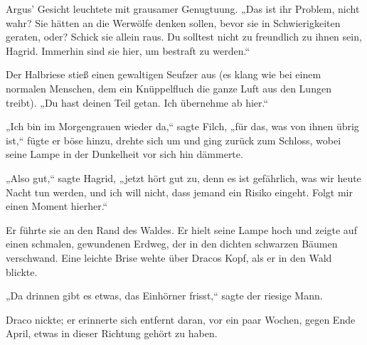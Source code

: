 Argus' Gesicht leuchtete mit grausamer Genugtuung. „Das ist ihr Problem, nicht wahr? Sie hätten an die Werwölfe denken sollen, bevor sie in Schwierigkeiten geraten, oder? Schick sie allein raus. Du solltest nicht zu freundlich zu ihnen sein, Hagrid. Immerhin sind sie hier, um bestraft zu werden.“

Der Halbriese stieß einen gewaltigen Seufzer aus (es klang wie bei einem normalen Menschen, dem ein Knüppelfluch die ganze Luft aus den Lungen treibt). „Du hast deinen Teil getan. Ich übernehme ab hier.“

„Ich bin im Morgengrauen wieder da,“ sagte Filch, „für das, was von ihnen übrig ist,“ fügte er böse hinzu, drehte sich um und ging zurück zum Schloss, wobei seine Lampe in der Dunkelheit vor sich hin dämmerte.

„Also gut,“ sagte Hagrid, „jetzt hört gut zu, denn es ist gefährlich, was wir heute Nacht tun werden, und ich will nicht, dass jemand ein Risiko eingeht. Folgt mir einen Moment hierher.“

Er führte sie an den Rand des Waldes. Er hielt seine Lampe hoch und zeigte auf einen schmalen, gewundenen Erdweg, der in den dichten schwarzen Bäumen verschwand. Eine leichte Brise wehte über Dracos Kopf, als er in den Wald blickte.

„Da drinnen gibt es etwas, das Einhörner frisst,“ sagte der riesige Mann.

Draco nickte; er erinnerte sich entfernt daran, vor ein paar Wochen, gegen Ende April, etwas in dieser Richtung gehört zu haben.

